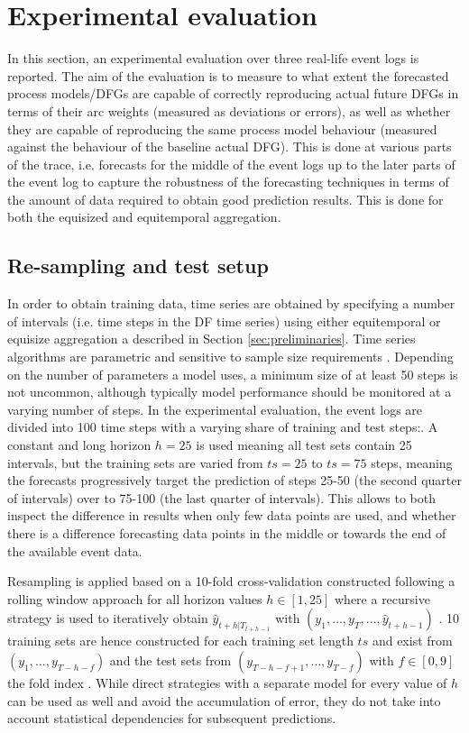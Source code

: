 \section{Experimental evaluation}\label{sec:experiment}
In this section, an experimental evaluation over three real-life event logs is reported.
The aim of the evaluation is to measure to what extent the forecasted process models/DFGs are capable of correctly reproducing actual future DFGs in terms of their arc weights (measured as deviations or errors), as well as whether they are capable of reproducing the same process model behaviour (measured against the behaviour of the baseline actual DFG).
This is done at various parts of the trace, i.e. forecasts for the middle of the event logs up to the later parts of the event log to capture the robustness of the forecasting techniques in terms of the amount of data required to obtain good prediction results.
This is done for both the equisized and equitemporal aggregation.

\subsection{Re-sampling and test setup}
In order to obtain training data, time series are obtained by specifying a number of intervals (i.e. time steps in the DF time series) using either equitemporal or equisize aggregation a described in Section \ref{sec:preliminaries}.
Time series algorithms are parametric and sensitive to sample size requirements \cite{hanke2001business}.
Depending on the number of parameters a model uses, a minimum size of at least 50 steps is not uncommon, although typically model performance should be monitored at a varying number of steps.
In the experimental evaluation, the event logs are divided into 100 time steps with a varying share of training and test steps:. A constant and long horizon $h=25$ is used meaning all test sets contain 25 intervals, but the training sets are varied from $ts=25$ to $ts=75$ steps, meaning the forecasts progressively target the prediction of steps 25-50 (the second quarter of intervals) over to 75-100 (the last quarter of intervals).
This allows to both inspect the difference in results when only few data points are used, and whether there is a difference forecasting data points in the middle or towards the end of the available event data.

Resampling is applied based on a 10-fold cross-validation constructed following a rolling window approach for all horizon values $h\in[1,25]$ where a recursive strategy is used to iteratively obtain $\hat{y}_{t+h|T_{t+h-1}}$ with $(y_1,\dots,y_{T},\dots,\hat{y}_{t+h-1})$ \cite{weigend2018time}.
10 training sets are hence constructed for each training set length $ts$ and exist from $(y_1,\dots,y_{T-h-f})$ and the test sets from $(y_{T-h-f+1},\dots,y_{T-f})$ with $f\in[0,9]$ the fold index \cite{bergmeir2012use}.
While direct strategies with a separate model for every value of $h$ can be used as well and avoid the accumulation of error, they do not take into account statistical dependencies for subsequent predictions.

